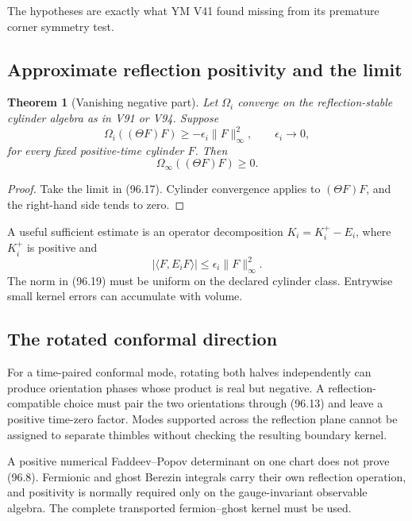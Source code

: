 \documentclass[11pt]{article}
\newtheorem{theorem}{Theorem}[section]
\begin{document}
The hypotheses are exactly what YM V41 found missing from its
premature corner symmetry test.

\subsection{Approximate reflection positivity and the limit}

\begin{theorem}[Vanishing negative part]
\label{thm:v11v96-approx}
Let \(\Omega_i\) converge on the reflection-stable cylinder algebra
as in V91 or V94.  Suppose
\[
                         \Omega_i((\Theta F)F)
                         \ge-\epsilon_i\|F\|_\infty^2,
                  \qquad \epsilon_i\longrightarrow0,        \tag{96.17}
\]
for every fixed positive-time cylinder \(F\).  Then
\[
                         \Omega_\infty((\Theta F)F)\ge0.     \tag{96.18}
\]
\end{theorem}

\begin{proof}
Take the limit in (96.17).  Cylinder convergence applies to
\((\Theta F)F\), and the right-hand side tends to zero.
\end{proof}

A useful sufficient estimate is an operator decomposition
\(K_i=K_i^+-E_i\), where \(K_i^+\) is positive and
\[
 |\langle F,E_iF\rangle|
       \le\epsilon_i\|F\|_\infty^2.                          \tag{96.19}
\]
The norm in (96.19) must be uniform on the declared cylinder class.
Entrywise small kernel errors can accumulate with volume.

\subsection{The rotated conformal direction}

For a time-paired conformal mode, rotating both halves independently
can produce orientation phases whose product is real but negative.
A reflection-compatible choice must pair the two orientations through
(96.13) and leave a positive time-zero factor.  Modes supported across
the reflection plane cannot be assigned to separate thimbles without
checking the resulting boundary kernel.

\begin{warning}
\label{warn:v11v96-ghost}
A positive numerical Faddeev--Popov determinant on one chart does not
prove (96.8).  Fermionic and ghost Berezin integrals carry their own
reflection operation, and positivity is normally required only on the
gauge-invariant observable algebra.  The complete transported
fermion--ghost kernel must be used.
\end{warning}
\end{document}
